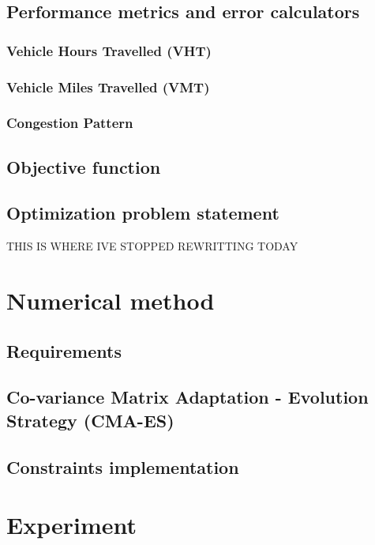 \subsection{Performance metrics and error calculators}
\label{subsec:pcs_intro}

\subsubsection{Vehicle Hours Travelled (VHT)}
\label{subsubsec:tvh}

\subsubsection{Vehicle Miles Travelled (VMT)}
\label{subsubsec:tvm}

\subsubsection{Congestion Pattern}
\label{subsubsec:cp}

\subsection{Objective function}
\label{subsec:fitnessintro}

\subsection{Optimization problem statement}
\label{subsec:statement}


\color{red}THIS IS WHERE IVE STOPPED REWRITTING TODAY\color{black}
\section{Numerical method}
\subsection{Requirements}
\label{subsec:requirements}

\subsection{Co-variance Matrix Adaptation - Evolution Strategy (CMA-ES)}
\label{subsec:cmaes}

\subsection{Constraints implementation}
\label{subsec:implementation}

\section{Experiment}

